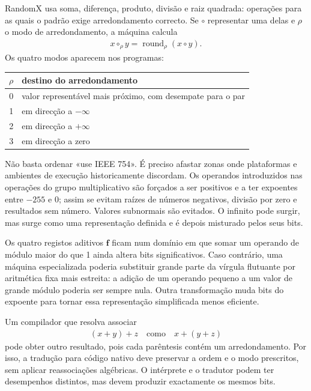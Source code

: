 RandomX usa soma, diferença, produto, divisão e raiz quadrada: operações para
as quais o padrão exige arredondamento correcto. Se \(\circ\) representar uma
delas e \(\rho\) o modo de arredondamento, a máquina calcula
\begin{align*}
 x\mathbin{\circ_\rho}y
 =\operatorname{round}_\rho(x\circ y).
\end{align*}
Os quatro modos aparecem nos programas:
\begin{center}
\begin{tabular}{c|l}
\(\rho\)&destino do arredondamento\\
\hline
0&valor representável mais próximo, com desempate para o par\\
1&em direcção a \(-\infty\)\\
2&em direcção a \(+\infty\)\\
3&em direcção a zero\\
\end{tabular}
\end{center}

Não basta ordenar «use IEEE 754». É preciso afastar zonas onde plataformas e
ambientes de execução historicamente discordam. Os operandos introduzidos nas
operações do grupo multiplicativo são forçados a ser positivos e a ter
expoentes entre \(-255\) e \(0\); assim se evitam raízes de números negativos,
divisão por zero e resultados sem número. Valores subnormais são evitados. O
infinito pode surgir, mas surge como uma representação definida e é depois
misturado pelos seus bits.

Os quatro registos aditivos \(\mathbf f\) ficam num domínio em que somar um
operando de módulo maior do que 1 ainda altera bits significativos. Caso
contrário, uma máquina especializada poderia substituir grande parte da
vírgula flutuante por aritmética fixa mais estreita: a adição de um operando
pequeno a um valor de grande módulo poderia ser sempre nula. Outra
transformação muda bits do expoente para tornar essa representação
simplificada menos eficiente.

Um compilador que resolva associar
\begin{align*}
 (x+y)+z\quad\text{como}\quad x+(y+z)
\end{align*}
pode obter outro resultado, pois cada parêntesis contém um arredondamento. Por
isso, a tradução para código nativo deve preservar a ordem e o modo prescritos,
sem aplicar reassociações algébricas. O intérprete e o tradutor podem ter
desempenhos distintos, mas devem produzir exactamente os mesmos bits.

